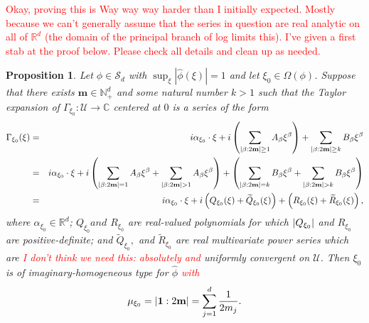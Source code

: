 \documentclass[11pt]{article}
\newtheorem{proposition}[theorem]{Proposition}
\theoremstyle{remark}
\newcommand{\lp}{\left(}
\newcommand{\rp}{\right)}
\newcommand{\al}{\alpha}
\newcommand{\be}{\beta}
\begin{document}
\textcolor{red}{Okay, proving this is Way way way harder than I initially expected. Mostly because we can't generally assume that the series in question are real analytic on all of $\mathbb{R}^d$ (the domain of the principal branch of log limits this). I've given a first stab at the proof below. Please check all details and clean up as needed.}
\begin{proposition}\label{prop:ExpandGamma}
Let $\phi\in\mathcal{S}_d$ with $\sup_{\xi}|\widehat{\phi}(\xi)|=1$ and let $\xi_0\in\Omega(\phi)$. Suppose that there exists $\mathbf{m}\in \mathbb{N}^d_+$ and some natural number $k > 1$ such that the Taylor expansion of $\Gamma_{\xi_0} : \mathcal{U}\to\mathbb{C}$ centered at $0$ is a series of the form
\begin{eqnarray*}
    \Gamma_{\xi_0}(\xi) 
    &=& i\al_{\xi_0} \cdot \xi + i \left( \sum_{\abs{\be : 2\mathbf{m}} \geq 1} A_\be \xi^\be\right) + \sum_{\abs{\be : 2\mathbf{m}} \geq k} B_\be \xi^\be \\
    &=& i\al_{\xi_0} \cdot \xi + i \lp \sum_{\abs{\be : 2\mathbf{m}} = 1} A_\be \xi^\be + \sum_{\abs{\be : 2\mathbf{m}} > 1} A_\be \xi^\be\rp 
    + \lp \sum_{\abs{\be : 2\mathbf{m}} = k} B_\be \xi^\be + \sum_{\abs{\be : 2\mathbf{m}} > k} B_\be \xi^\be \rp \\
    &=&  i\al_{\xi_0} \cdot \xi + i\lp Q_{\xi_0}(\xi) + \widetilde{Q}_{\xi_0}(\xi)\rp + \lp R_{\xi_0}(\xi) + \widetilde{R}_{\xi_0}(\xi) \rp,
\end{eqnarray*}
where $\al_{\xi_0} \in \mathbb{R}^d$;    $Q_{\xi_0} and $ $R_{\xi_0}$ are real-valued polynomials for which $\abs{Q_{\xi_0}}$ and $R_{\xi_0}$ are positive-definite; and  $\widetilde{Q}_{\xi_0},$ and $\widetilde{R}_{\xi_0}$ are real multivariate power series which are \textcolor{red}{I don't think we need this: absolutely and} uniformly convergent on $\mathcal{U}$. Then $\xi_0$ is of imaginary-homogeneous type for $\widehat{\phi}$ \textcolor{red}{with
\begin{equation*}
    \mu_{\xi_0}=\abs{\mathbf{1}:2\mathbf{m}}=\sum_{j=1}^d\frac{1}{2m_j}.
\end{equation*}}
\end{proposition}
\end{document}
